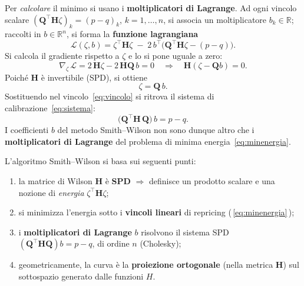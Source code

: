 \documentclass[11pt,a4paper]{article}
\theoremstyle{plain}
\theoremstyle{definition}
\theoremstyle{remark}
\newcommand{\Qmat}{\mathbf{Q}}
\newcommand{\Hmat}{\mathbf{H}}
\newcommand{\transp}{^{\!\top}}
\begin{document}
Per \emph{calcolare} il minimo si usano i \textbf{moltiplicatori di Lagrange}.
Ad ogni vincolo scalare $(\Qmat\transp\Hmat\zeta)_k = (p-q)_k$, $k=1,\ldots,n$,
si associa un moltiplicatore $b_k\in\mathbb{R}$; raccolti in $b\in\mathbb{R}^n$, si forma la
\textbf{funzione lagrangiana}
\begin{equation}
  \mathcal{L}(\zeta,b)
  = \zeta\transp\Hmat\zeta
    \;-\; 2\,b\transp\!\bigl(\Qmat\transp\Hmat\zeta - (p-q)\bigr).
  \label{eq:lagrangiana}
\end{equation}
Si calcola il gradiente rispetto a $\zeta$ e lo si pone uguale a zero:
\[
  \nabla_\zeta\,\mathcal{L}
  = 2\,\Hmat\zeta - 2\,\Hmat\Qmat\,b = 0
  \quad\Longrightarrow\quad
  \Hmat(\zeta - \Qmat b) = 0.
\]
Poich\'e $\Hmat$ \`e invertibile (SPD), si ottiene
\[
  \zeta = \Qmat\, b .
\]
Sostituendo nel vincolo~\eqref{eq:vincolo} si ritrova il sistema di
calibrazione~\eqref{eq:sistema}:
\[
  \bigl(\Qmat\transp \Hmat\, \Qmat\bigr)\, b = p - q .
\]
I coefficienti $b$ del metodo Smith--Wilson non sono dunque altro che i
\textbf{moltiplicatori di Lagrange} del problema di minima energia~\eqref{eq:minenergia}.


\begin{keybox}
L'algoritmo Smith--Wilson si basa sui seguenti punti:
\begin{enumerate}
  \item la matrice di Wilson $\Hmat$ \`e \textbf{SPD} $\Rightarrow$ definisce un prodotto
        scalare e una nozione di \emph{energia} $\zeta\transp\Hmat\zeta$;
  \item si minimizza l'energia sotto i \textbf{vincoli lineari} di repricing
        (\,\eqref{eq:minenergia}\,);
  \item i \textbf{moltiplicatori di Lagrange} $b$ risolvono il sistema SPD
        $(\Qmat\transp\Hmat\Qmat)b = p-q$, di ordine $n$ (Cholesky);
  \item geometricamente, la curva \`e la \textbf{proiezione ortogonale} (nella metrica
        $\Hmat$) sul sottospazio generato dalle funzioni $H$.
\end{enumerate}
\end{keybox}
\end{document}
